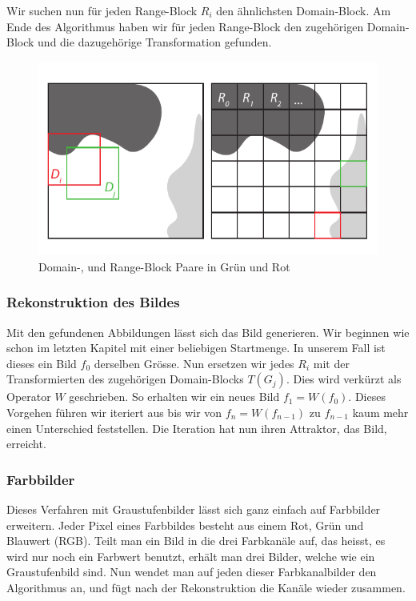 Wir suchen nun für jeden Range-Block $R_i$ den ähnlichsten Domain-Block.
Am Ende des Algorithmus haben wir für jeden Range-Block den zugehörigen Domain-Block und die dazugehörige Transformation gefunden.

\begin{figure}	
	\centering
	\includegraphics[width=\textwidth]{papers/ifs/images/FIC}
	\caption{Domain-, und Range-Block Paare in Grün und Rot}
	\label{ifs:FIC}
\end{figure}

\subsubsection{Rekonstruktion des Bildes}
Mit den gefundenen Abbildungen lässt sich das Bild generieren.
Wir beginnen wie schon im letzten Kapitel mit einer beliebigen Startmenge.
In unserem Fall ist dieses ein Bild  $f_0$ derselben Grösse.
Nun ersetzen wir jedes $R_i$ mit der Transformierten des zugehörigen Domain-Blocks $T(G_j)$.
Dies wird verkürzt als Operator $W$ geschrieben.
So erhalten wir ein neues Bild $f_1 = W(f_0)$.
Dieses Vorgehen führen wir iteriert aus bis wir von $f_n = W(f_{n-1})$ zu $f_{n-1}$ kaum mehr einen Unterschied feststellen. Die Iteration hat nun ihren Attraktor, das Bild, erreicht.

\subsubsection{Farbbilder}
Dieses Verfahren mit Graustufenbilder lässt sich ganz einfach auf Farbbilder erweitern.
Jeder Pixel eines Farbbildes besteht aus einem Rot, Grün und Blauwert (RGB).
Teilt man ein Bild in die drei Farbkanäle auf, das heisst, es wird nur noch ein Farbwert benutzt, erhält man drei Bilder, welche wie ein Graustufenbild sind.
Nun wendet man auf jeden dieser Farbkanalbilder den Algorithmus an, und fügt nach der Rekonstruktion die Kanäle wieder zusammen. 


